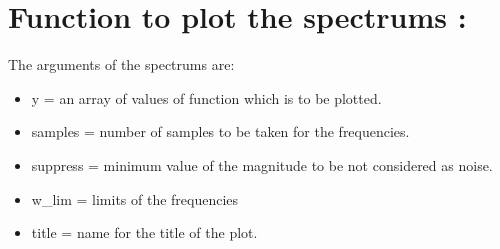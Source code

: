 \documentclass[11pt]{article}
\begin{document}
    \hypertarget{function-to-plot-the-spectrums}{%
\section{Function to plot the spectrums
:}\label{function-to-plot-the-spectrums}}

The arguments of the spectrums are:\begin{itemize} \item y = an array of values of function
which is to be plotted. \item samples = number of samples to be taken for
the frequencies. \item suppress = minimum value of the magnitude to be not
considered as noise. \item w\_lim = limits of the frequencies \item title = name
for the title of the plot.
\end{itemize}
\end{document}
